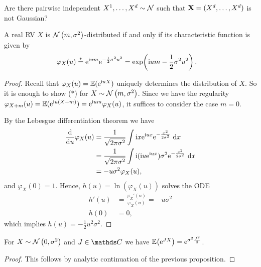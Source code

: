 \begin{ex}
	Are there pairwise independent
	\(X^1, \dots, X^d \sim \mathcal{N}\)
	such that \(\mathbf{X} = (X^d, \dots, X^d)\) is not Gaussian?
\end{ex}

\begin{prop}
A real RV $X$ is $\mathcal{N}\left(m,\sigma^2\right)$-distributed if and only if
its characteristic function is given by
\begin{align*}
	\varphi_X(u)
	&\overset*= {\mathrm{e}}^{\mathrm{i} um}\mathrm{e}^{-\frac{1}{2}\sigma^2u^2}
	= \exp\!\left(\mathrm{i} um - \frac12\sigma^2u^2\right).
\qedhere
\end{align*}
\end{prop}

\begin{proof}
Recall that $\varphi_X(u) = \E[norm]{\e^{\i uX}}$ uniquely determines
the distribution of $X$.
So it is enough to show (\(*\))
for $X \sim \mathcal{N}\left(m,\sigma^2\right)$.
Since we have the regularity
$\varphi_{X+m}(u) = \E[norm]{\e^{\i u(X+m)}}=\e^{\i um}\varphi_X(u)$,
it suffices to consider the case $m=0$.

By the Lebesgue differentiation theorem we have
\begin{align*}
\frac{\mathrm{d}}{\mathrm{d}u}\varphi_X(u)&=\frac{1}{\sqrt{2\pi \sigma^2}} \int \mathrm{i} x\mathrm{e}^{\mathrm{i} ux}\mathrm{e}^{-\frac{x^2}{2 \sigma^2}}~\mathrm{d}x\\
&=\frac{1}{\sqrt{2 \pi \sigma^2}} \int \mathrm{i} (\mathrm{i} u \mathrm{e}^{\mathrm{i} ux})\sigma^2 \mathrm{e}^{-\frac{x^2}{2 \sigma^2}}~\mathrm{d}x\\
&=-u \sigma^2 \varphi_X(u),
\end{align*}
and $\varphi_X(0)=1$.
Hence, $h(u)=\ln(\varphi_X(u))$ solves the ODE
\begin{align*}
	h'(u) &= \frac{\varphi_X'(u)}{\varphi_X(u)}=-u \sigma^2\\
	h(0)  &= 0,
\end{align*}
which implies $h(u)=-\frac{1}{2}u^2\sigma^2$.
\end{proof}

\begin{cor}
For $X \sim \mathcal{N}\left(0,\sigma^2\right)$ and $J\in \C$ we have $\E{\e^{JX}}=\e^{\sigma^2 \frac{J^2}{2}}$.
\end{cor}
\begin{proof}
This follows by analytic continuation of the previous proposition.
\end{proof}

